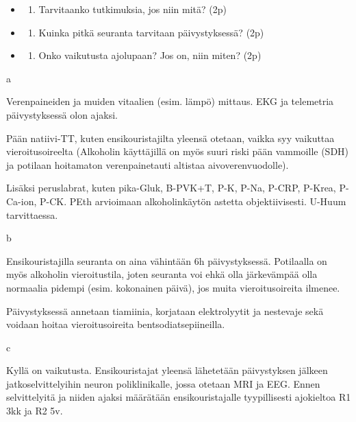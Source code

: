 \documentclass[
]{book}
\providecommand{\tightlist}{%
  \setlength{\itemsep}{0pt}\setlength{\parskip}{0pt}}
\begin{document}
\begin{itemize}
\tightlist
\item
  \begin{enumerate}
  \def\labelenumi{\alph{enumi}.}
  \tightlist
  \item
    Tarvitaanko tutkimuksia, jos niin mitä? (2p)
  \end{enumerate}
\item
  \begin{enumerate}
  \def\labelenumi{\alph{enumi}.}
  \setcounter{enumi}{1}
  \tightlist
  \item
    Kuinka pitkä seuranta tarvitaan päivystyksessä? (2p)
  \end{enumerate}
\item
  \begin{enumerate}
  \def\labelenumi{\alph{enumi}.}
  \setcounter{enumi}{2}
  \tightlist
  \item
    Onko vaikutusta ajolupaan? Jos on, niin miten? (2p)
  \end{enumerate}
\end{itemize}

a

Verenpaineiden ja muiden vitaalien (esim. lämpö) mittaus. EKG ja telemetria päivystyksessä olon ajaksi.

Pään natiivi-TT, kuten ensikouristajilta yleensä otetaan, vaikka syy vaikuttaa vieroitusoireelta (Alkoholin käyttäjillä on myös suuri riski pään vammoille (SDH) ja potilaan hoitamaton verenpainetauti altistaa aivoverenvuodolle).

Lisäksi peruslabrat, kuten pika-Gluk, B-PVK+T, P-K, P-Na, P-CRP, P-Krea, P-Ca-ion, P-CK. PEth arvioimaan alkoholinkäytön astetta objektiivisesti. U-Huum tarvittaessa.

b

Ensikouristajilla seuranta on aina vähintään 6h päivystyksessä. Potilaalla on myös alkoholin vieroitustila, joten seuranta voi ehkä olla järkevämpää olla normaalia pidempi (esim. kokonainen päivä), jos muita vieroitusoireita ilmenee.

Päivystyksessä annetaan tiamiinia, korjataan elektrolyytit ja nestevaje sekä voidaan hoitaa vieroitusoireita bentsodiatsepiineilla.

c

Kyllä on vaikutusta. Ensikouristajat yleensä lähetetään päivystyksen jälkeen jatkoselvittelyihin neuron poliklinikalle, jossa otetaan MRI ja EEG. Ennen selvittelyitä ja niiden ajaksi määrätään ensikouristajalle tyypillisesti ajokieltoa R1 3kk ja R2 5v.
\end{document}
